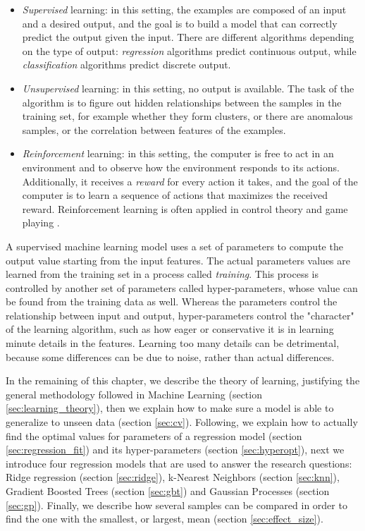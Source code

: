 \documentclass[a4paper,11pt]{kth-mag}
\begin{document}
\begin{itemize}
\item \emph{Supervised} learning: in this setting, the examples are composed of an input and a desired output, and the goal is to build a model that can correctly predict the output given the input. There are different algorithms depending on the type of output: \emph{regression} algorithms predict continuous output, while \emph{classification} algorithms predict discrete output.

\item \emph{Unsupervised} learning: in this setting, no output is available. The task of the algorithm is to figure out hidden relationships between the samples in the training set, for example whether they form clusters, or there are anomalous samples, or the correlation between features of the examples.

\item \emph{Reinforcement} learning: in this setting, the computer is free to act in an environment and to observe how the environment responds to its actions. Additionally, it receives a \emph{reward} for every action it takes, and the goal of the computer is to learn a sequence of actions that maximizes the received reward. Reinforcement learning is often applied in control theory \cite{rlcontrol} and game playing \citep{alphazero}.
\end{itemize}

A supervised machine learning model uses a set of parameters to compute the output value starting from the input features. The actual parameters values are learned from the training set in a process called \emph{training}. This process is controlled by another set of parameters called hyper-parameters, whose value can be found from the training data as well. Whereas the parameters control the relationship between input and output, hyper-parameters control the "character" of the learning algorithm, such as how eager or conservative it is in learning minute details in the features. Learning too many details can be detrimental, because some differences can be due to noise, rather than actual differences.

In the remaining of this chapter, we describe the theory of learning, justifying the general methodology followed in Machine Learning (section \ref{sec:learning_theory}), then we explain how to make sure a model is able to generalize to unseen data (section \ref{sec:cv}). Following, we explain how to actually find the optimal values for parameters of a regression model (section \ref{sec:regression_fit}) and its hyper-parameters (section \ref{sec:hyperopt}), next we introduce four regression models that are used to answer the research questions: Ridge regression (section \ref{sec:ridge}), k-Nearest Neighbors (section \ref{sec:knn}), Gradient Boosted Trees (section \ref{sec:gbt}) and Gaussian Processes (section \ref{sec:gp}). Finally, we describe how several samples can be compared in order to find the one with the smallest, or largest, mean (section \ref{sec:effect_size}).
\end{document}
